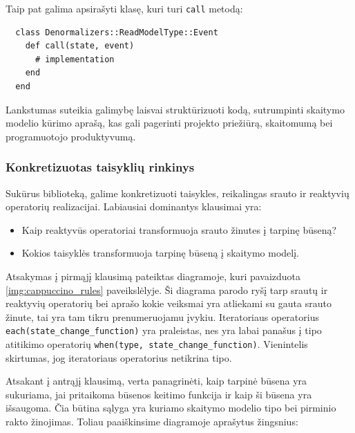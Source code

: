 Taip pat galima apsirašyti klasę, kuri turi \lstinline|call| metodą:

\begin{lstlisting}
  class Denormalizers::ReadModelType::Event
    def call(state, event)
      # implementation
    end
  end
\end{lstlisting}

Lankstumas suteikia galimybę laisvai struktūrizuoti kodą, sutrumpinti skaitymo modelio kūrimo aprašą, kas gali pagerinti projekto priežiūrą, skaitomumą bei programuotojo produktyvumą.

\subsubsection{Konkretizuotas taisyklių rinkinys}

Sukūrus biblioteką, galime konkretizuoti taisykles, reikalingas srauto ir reaktyvių operatorių realizacijai. Labiausiai dominantys klausimai yra:

\begin{itemize}
  \item Kaip reaktyvūs operatoriai transformuoja srauto žinutes į tarpinę būseną?
  \item Kokios taisyklės transformuoja tarpinę būseną į skaitymo modelį.
\end{itemize}

Atsakymas į pirmąjį klausimą pateiktas diagramoje, kuri pavaizduota \ref{img:cappuccino_rules} paveikslėlyje. Ši diagrama parodo ryšį tarp srautų ir reaktyvių operatorių bei aprašo kokie veiksmai yra atliekami su gauta srauto žinute, tai yra tam tikru prenumeruojamu įvykiu. Iteratoriaus operatorius \lstinline|each(state_change_function)| yra praleistas, nes yra labai panašus į tipo atitikimo operatorių \lstinline|when(type, state_change_function)|. Vienintelis skirtumas, jog iteratoriaus operatorius netikrina tipo.

Atsakant į antrąjį klausimą, verta panagrinėti, kaip tarpinė būsena yra sukuriama, jai pritaikoma būsenos keitimo funkcija ir kaip ši būsena yra išsaugoma. Čia būtina sąlyga yra kuriamo skaitymo modelio tipo bei pirminio rakto žinojimas. Toliau paaiškinsime diagramoje aprašytus žingsnius:

